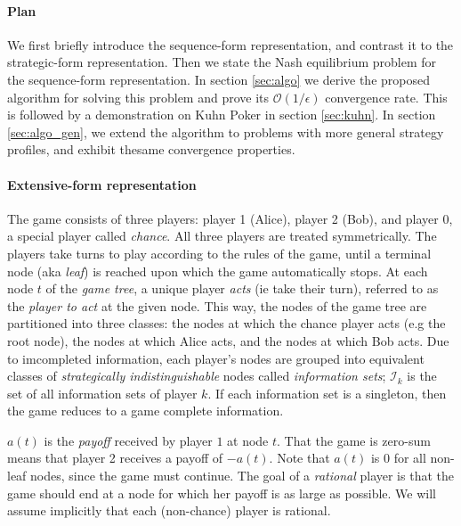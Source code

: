 \documentclass{article} %
\begin{document}
\paragraph{Plan}
We first briefly introduce the sequence-form representation, and contrast it to the strategic-form representation. Then we state the Nash equilibrium problem for the sequence-form representation. In section \ref{sec:algo} we derive the proposed algorithm for solving this problem and prove its $\mathcal{O}(1/\epsilon)$ convergence rate.  This is followed by a demonstration on Kuhn Poker in section \ref{sec:kuhn}. In section \ref{sec:algo_gen}, we extend  the algorithm to problems with more general strategy profiles, and exhibit thesame convergence properties.


\paragraph{Extensive-form representation}
The game consists of three players: player 1 (Alice), player 2 (Bob), and player 0, a special player called \textit{chance}. All three players are treated symmetrically.
The players take turns to play according to the rules of the game, until a terminal node (aka \textit{leaf}) is reached upon which the game automatically stops. %
At each node $t$ of the \textit{game tree}, a unique player \textit{acts} (ie take their turn), referred to as the \textit{player to act} at the given node. This way, the nodes of the game tree are partitioned into three classes: the nodes at which the chance player acts (e.g the root node), the nodes at which Alice acts, and the nodes at which Bob acts. Due to imcompleted information, each player's nodes are grouped into equivalent classes of \textit{strategically indistinguishable} nodes called \textit{information sets}; $\mathcal{I}_k$ is the set of all information sets of player $k$. If each information set is a singleton, then the game reduces to a game complete information.

$a(t)$ is the \textit{payoff} received by player $1$ at node $t$. That the game is zero-sum means that player 2
receives a payoff of $-a(t)$. Note that $a(t)$ is $0$ for all non-leaf nodes, since the game must continue.
The goal of a \textit{rational} player is that the game should end at a node for which her payoff is as large as possible.
We will assume implicitly that each (non-chance) player is rational.
\end{document}
